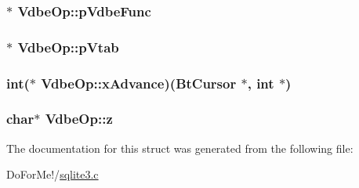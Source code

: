 \hypertarget{struct_vdbe_op_a4091014dd0f37dfb31fb6e75f42f06ec}{
\subsubsection[{p\-Vdbe\-Func}]{$\ast$ Vdbe\-Op\-::p\-Vdbe\-Func}}\label{struct_vdbe_op_a4091014dd0f37dfb31fb6e75f42f06ec}
\hypertarget{struct_vdbe_op_a4582906f096cea569015aee8b4b8423f}{
\subsubsection[{p\-Vtab}]{$\ast$ Vdbe\-Op\-::p\-Vtab}}\label{struct_vdbe_op_a4582906f096cea569015aee8b4b8423f}
\hypertarget{struct_vdbe_op_abddaaf74c394f80091ef257833b2a7ad}{
\subsubsection[{x\-Advance}]{\setlength{\rightskip}{0pt plus 5cm}int($\ast$ Vdbe\-Op\-::x\-Advance)({\bf Bt\-Cursor} $\ast$, int $\ast$)}}\label{struct_vdbe_op_abddaaf74c394f80091ef257833b2a7ad}
\hypertarget{struct_vdbe_op_aa9221aa6dd0a193b1760e4ecfc7376a7}{
\subsubsection[{z}]{\setlength{\rightskip}{0pt plus 5cm}char$\ast$ Vdbe\-Op\-::z}}\label{struct_vdbe_op_aa9221aa6dd0a193b1760e4ecfc7376a7}


The documentation for this struct was generated from the following file\-:\begin{DoxyCompactItemize}
\item 
Do\-For\-Me!/\hyperlink{sqlite3_8c}{sqlite3.\-c}\end{DoxyCompactItemize}
